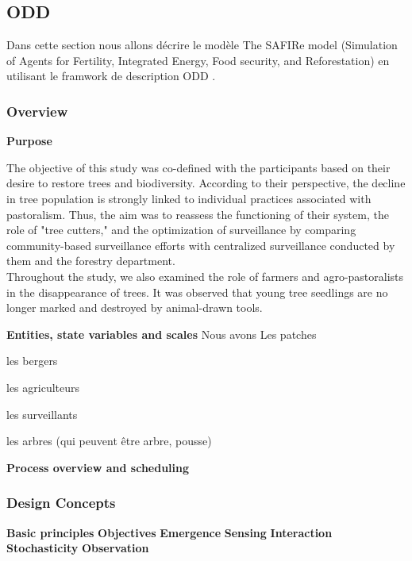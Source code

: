 \documentclass{article}
\begin{document}
\subsection{ODD }

    Dans cette section nous allons décrire le modèle The SAFIRe model (Simulation of Agents for Fertility, Integrated Energy, Food security, and Reforestation) en utilisant le framwork de description ODD \cite{grimm_standard_2006,grimm_odd_2010,grimm_odd_2020}.

    \subsubsection{Overview}

        \textbf{Purpose}

        The objective of this study was co-defined with the participants based on their desire to restore trees and biodiversity. According to their perspective, the decline in tree population is strongly linked to individual practices associated with pastoralism. Thus, the aim was to reassess the functioning of their system, the role of "tree cutters," and the optimization of surveillance by comparing community-based surveillance efforts with centralized surveillance conducted by them and the forestry department.\\

        Throughout the study, we also examined the role of farmers and agro-pastoralists in the disappearance of trees. It was observed that young tree seedlings are no longer marked and destroyed by animal-drawn tools.

        \textbf{Entities, state variables and scales}
        Nous avons 
        Les patches

        les bergers

        les agriculteurs

        les surveillants

        les arbres (qui peuvent être arbre, pousse)
    
        \textbf{Process overview and scheduling}
        \textbf{}
        \textbf{}
        \textbf{}
        \textbf{}


    \subsubsection{Design Concepts}
        \textbf{Basic principles}
        \textbf{Objectives}
        \textbf{Emergence}
        \textbf{Sensing}
        \textbf{Interaction}
        \textbf{Stochasticity}
        \textbf{Observation}
\end{document}
